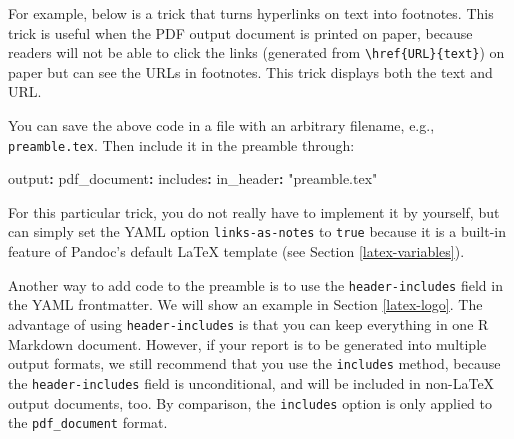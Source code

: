 \documentclass[
  11pt,
]{krantz}
\newenvironment{Shaded}{\begin{snugshade}}{\end{snugshade}}
\newcommand{\AttributeTok}[1]{\textcolor[rgb]{0.61,0.61,0.61}{#1}}
\newcommand{\CommentTok}[1]{\textcolor[rgb]{0.37,0.37,0.37}{\textit{#1}}}
\newcommand{\ExtensionTok}[1]{#1}
\newcommand{\FunctionTok}[1]{\textcolor[rgb]{0,0,0}{#1}}
\newcommand{\KeywordTok}[1]{\textcolor[rgb]{0.27,0.27,0.27}{\textbf{#1}}}
\newcommand{\NormalTok}[1]{#1}
\newcommand{\StringTok}[1]{\textcolor[rgb]{0.5,0.5,0.5}{#1}}
\begin{document}
For example, below is a trick that turns hyperlinks on text into footnotes. This trick is useful when the PDF output document is printed on paper, because readers will not be able to click the links (generated from \texttt{\textbackslash{}href\{URL\}\{text\}}) on paper but can see the URLs in footnotes. This trick displays both the text and URL.

\begin{Shaded}
\end{Shaded}

You can save the above code in a file with an arbitrary filename, e.g., \texttt{preamble.tex}. Then include it in the preamble through:

\begin{Shaded}
\begin{Highlighting}[]
\FunctionTok{output}\KeywordTok{:}
\AttributeTok{  }\FunctionTok{pdf_document}\KeywordTok{:}
\AttributeTok{    }\FunctionTok{includes}\KeywordTok{:}
\AttributeTok{      }\FunctionTok{in_header}\KeywordTok{:}\AttributeTok{ }\StringTok{"preamble.tex"}
\end{Highlighting}
\end{Shaded}

For this particular trick, you do not really have to implement it by yourself, but can simply set the YAML option \texttt{links-as-notes} to \texttt{true} because it is a built-in feature of Pandoc's default LaTeX template (see Section \ref{latex-variables}).

Another way to add code to the preamble is to use the \texttt{header-includes} field in the YAML frontmatter. We will show an example in Section \ref{latex-logo}. The advantage of using \texttt{header-includes} is that you can keep everything in one R Markdown document. However, if your report is to be generated into multiple output formats, we still recommend that you use the \texttt{includes} method, because the \texttt{header-includes} field is unconditional, and will be included in non-LaTeX output documents, too. By comparison, the \texttt{includes} option is only applied to the \texttt{pdf\_document} format.
\end{document}
